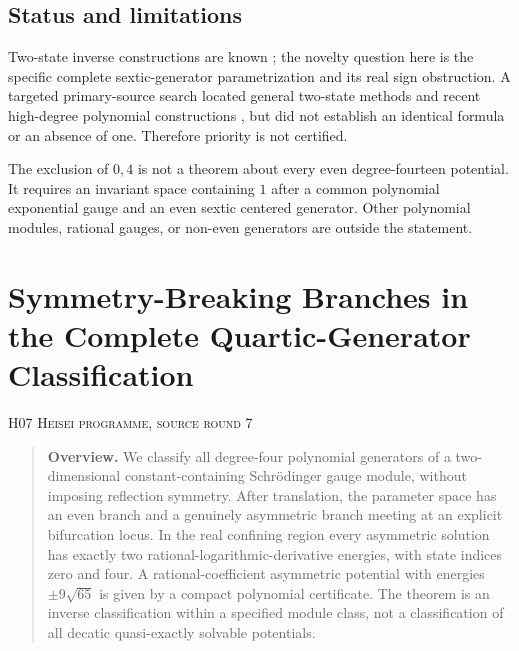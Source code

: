\documentclass[11pt,a4paper]{article}
\theoremstyle{definition}\newtheorem{definition}[theorem]{Definition}
\theoremstyle{remark}\newtheorem{remark}[theorem]{Remark}
\numberwithin{equation}{section}
\begin{document}
\subsection{Status and limitations}\label{H06-sec-7}
Two-state inverse constructions are known \cite{ref087}; the novelty question here is the specific complete sextic-generator parametrization and its real sign obstruction. A targeted primary-source search located general two-state methods and recent high-degree polynomial constructions \cite{ref086}, but did not establish an identical formula or an absence of one. Therefore priority is not certified.

The exclusion of $0,4$ is not a theorem about every even degree-fourteen potential. It requires an invariant space containing $1$ after a common polynomial exponential gauge and an even sextic centered generator. Other polynomial modules, rational gauges, or non-even generators are outside the statement.




\clearpage
\section[H07 --- Symmetry-Breaking Branches in the Complete Quartic-Generator Classification]{Symmetry-Breaking Branches in the Complete Quartic-Generator Classification}\label{contrib-H07}
\noindent\textsc{H07 \quad Heisei programme, source round 7}\par\medskip






\begin{quote}\small\textbf{Overview.} We classify all degree-four polynomial generators of a two-dimensional constant-containing Schr\"odinger gauge module, without imposing reflection symmetry. After translation, the parameter space has an even branch and a genuinely asymmetric branch meeting at an explicit bifurcation locus. In the real confining region every asymmetric solution has exactly two rational-logarithmic-derivative energies, with state indices zero and four. A rational-coefficient asymmetric potential with energies $\pm9\sqrt{65}$ is given by a compact polynomial certificate. The theorem is an inverse classification within a specified module class, not a classification of all decatic quasi-exactly solvable potentials.\end{quote}
\end{document}
